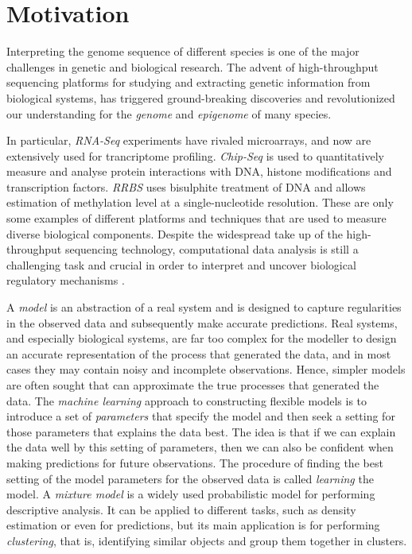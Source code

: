 \section{Motivation} \label{motivation-intro-l}
Interpreting the genome sequence of different species is one of the major challenges in genetic and biological research. The advent of high-throughput sequencing platforms for studying and extracting genetic information from biological systems, has triggered ground-breaking discoveries and revolutionized our understanding for the \emph{genome} and \emph{epigenome} of many species. 

In particular, \emph{RNA-Seq} experiments \citep{Marioni2008} have rivaled microarrays, and now are extensively used for trancriptome profiling. \emph{Chip-Seq} \citep{Park2009} is used to quantitatively measure and analyse protein interactions with DNA, \ie histone modifications and transcription factors. \emph{RRBS} \citep{Meissner2005} uses bisulphite treatment of DNA and allows estimation of methylation level at a single-nucleotide resolution. These are only some examples of different platforms and techniques that are used to measure diverse biological components. Despite the widespread take up of the high-throughput sequencing technology, computational data analysis is still a challenging task and crucial in order to interpret and uncover biological regulatory mechanisms \citep{Park2009}.

A \emph{model} is an abstraction of a real system and is designed to capture regularities in the observed data and subsequently make accurate predictions. Real systems, and especially biological systems, are far too complex for the modeller to design an accurate representation of the process that generated the data, and in most cases they may contain noisy and incomplete observations. Hence, simpler models are often sought that can approximate the true processes that generated the data. The \emph{machine learning} approach to constructing flexible models is to introduce a set of \emph{parameters} that specify the model and then seek a setting for those parameters that explains the data best. The idea is that if we can explain the data well by this setting of parameters, then we can also be confident when making predictions for future observations. The procedure of finding the best setting of the model parameters for the observed data is called \emph{learning} the model. A \emph{mixture model} is a widely used probabilistic model for performing descriptive analysis. It can be applied to different tasks, such as density estimation or even for predictions, but its main application is for performing \emph{clustering}, that is, identifying similar objects and group them together in clusters. 


